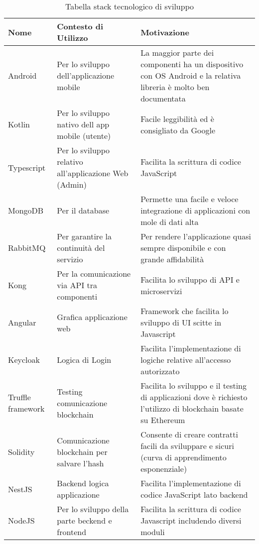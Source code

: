     \begin{longtable}{ C{5cm} C{4cm} C{5cm} }
        \caption{Tabella stack tecnologico di sviluppo}                                                                                 \\
        \rowcolor{\primaryColor}
        \textcolor{\secondaryColor}{\textbf{Nome}} & \textcolor{\secondaryColor}{\textbf{Contesto di Utilizzo}} & \textcolor{\secondaryColor}{\textbf{Motivazione}}\\ \endhead
        {Android} & {Per lo sviluppo dell'applicazione mobile}   & {La maggior parte dei componenti ha un dispositivo con OS Android e la relativa libreria è molto ben documentata}\\
        {Kotlin} & {Per lo sviluppo nativo dell app mobile (utente)} & {Facile leggibilità ed è consigliato da Google} \\
        {Typescript} & {Per lo sviluppo relativo all'applicazione Web (Admin)} & { Facilita la scrittura di codice JavaScript } \\
        {MongoDB} & {Per il database} & { Permette una facile e veloce integrazione di applicazioni con mole di dati alta } \\
        {RabbitMQ} & {Per garantire la continuità del servizio} & {Per rendere l'applicazione quasi sempre disponibile e con grande affidabilità} \\
        {Kong} & {Per la comunicazione via API tra componenti} & {Facilita lo sviluppo di API e microservizi} \\
        {Angular} & {Grafica applicazione web} & {Framework che facilita lo sviluppo di UI scitte in Javascript} \\
        {Keycloak} & {Logica di Login} & {Facilita l'implementazione di logiche relative all'accesso autorizzato} \\
        {Truffle framework} & {Testing comunicazione blockchain} & {Facilita lo sviluppo e il testing di applicazioni dove è richiesto l'utilizzo di blockchain basate su Ethereum} \\
        {Solidity} & {Comunicazione blockchain per salvare l'hash} & {Consente di creare contratti facili da sviluppare e sicuri (curva di apprendimento esponenziale)} \\
        {NestJS} & {Backend logica applicazione} & {Facilita l'implementazione di codice JavaScript lato backend} \\
        {NodeJS} & {Per lo sviluppo della parte beckend e frontend} & {Facilita la scrittura di codice Javascript includendo diversi moduli} \\
    \end{longtable}
    

